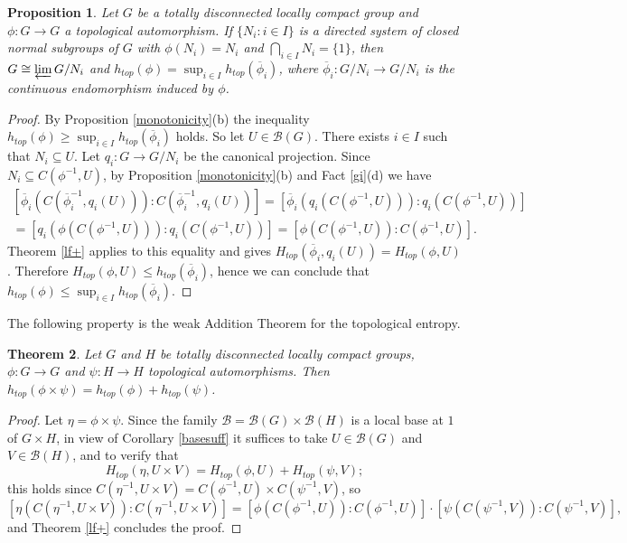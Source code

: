 \documentclass[11pt]{article}
\newtheorem{theorem}{Theorem}[section]
\newtheorem{proposition}[theorem]{Proposition}
\theoremstyle{definition}
\numberwithin{equation}{section}
\begin{document}
\begin{proposition}
Let $G$ be a totally disconnected locally compact group and $\phi:G\to G$ a topological automorphism. If $\{N_i:i\in I\}$ is a directed system of closed normal subgroups of $G$ with $\phi(N_i)=N_i$ and $\bigcap_{i\in I} N_i=\{1\}$, then $G\cong \varprojlim G/N_i$ and $h_{top}(\phi)=\sup_{i\in I} h_{top}(\overline \phi_i)$, where $\overline \phi_i:G/N_i\to G/N_i$ is the continuous endomorphism induced by $\phi$.
\end{proposition}
\begin{proof}
By Proposition \ref{monotonicity}(b) the inequality $h_{top}(\phi)\geq\sup_{i\in I}h_{top}(\overline\phi_i)$ holds. So let $U\in\mathcal B(G)$. There exists $i\in I$ such that $N_i\subseteq U$. Let $q_i:G\to G/N_i$ be the canonical projection. Since $N_i\subseteq C(\phi^{-1},U)$, by Proposition \ref{monotonicity}(b) and Fact \ref{gi}(d) we have 
\begin{equation*}\begin{split}
[\overline\phi_i(C(\overline\phi_i^{-1},q_i(U))):C(\overline\phi_i^{-1},q_i(U))]=[\overline\phi_i(q_i(C(\phi^{-1},U))):q_i(C(\phi^{-1},U))]\\
=[q_i(\phi(C(\phi^{-1},U))):q_i(C(\phi^{-1},U))]=[\phi(C(\phi^{-1},U)):C(\phi^{-1},U)].
\end{split}\end{equation*}
Theorem \ref{lf+} applies to this equality and gives $H_{top}(\overline\phi_i,q_i(U))=H_{top}(\phi,U)$. Therefore $H_{top}(\phi,U)\leq h_{top}(\overline\phi_i)$, hence we can conclude that $h_{top}(\phi)\leq\sup_{i\in I}h_{top}(\overline\phi_i)$.
\end{proof}

The following property is the weak Addition Theorem for the topological entropy.

\begin{theorem}
Let $G$ and $H$ be totally disconnected locally compact groups, $\phi:G\to G$ and $\psi:H\to H$ topological automorphisms. Then $h_{top}(\phi\times \psi)=h_{top}(\phi)+h_{top}(\psi)$.
\end{theorem}
\begin{proof}
Let $\eta=\phi\times\psi$. Since the family $\mathcal B=\mathcal B(G)\times\mathcal B(H)$ is a local base at $1$ of $G\times H$, in view of Corollary \ref{basesuff} it suffices to take $U\in\mathcal B(G)$ and $V\in\mathcal B(H)$, and to verify that $$H_{top}(\eta,U\times V)=H_{top}(\phi,U)+H_{top}(\psi,V);$$
this holds since $C(\eta^{-1},U\times V)=C(\phi^{-1},U)\times C(\psi^{-1},V)$, so
$$[\eta(C(\eta^{-1},U\times V)):C(\eta^{-1},U\times V)]=[\phi(C(\phi^{-1},U)):C(\phi^{-1},U)]\cdot[\psi(C(\psi^{-1},V)):C(\psi^{-1},V)],$$
and Theorem \ref{lf+} concludes the proof.
\end{proof}
\end{document}
